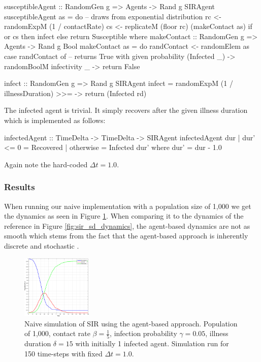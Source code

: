 \begin{HaskellCode}
susceptibleAgent :: RandomGen g => Agents -> Rand g SIRAgent
susceptibleAgent as = do
    -- draws from exponential distribution
    rc <- randomExpM (1 / contactRate) 
    cs <- replicateM (floor rc) (makeContact as)
    if or cs
      then infect
      else return Susceptible
  where
    makeContact :: RandomGen g => Agents -> Rand g Bool
    makeContact as = do
      randContact <- randomElem as
      case randContact of
        -- returns True with given probability 
        (Infected _) -> randomBoolM infectivity 
        _            -> return False

    infect :: RandomGen g => Rand g SIRAgent
    infect = randomExpM (1 / illnessDuration) 
               >>= \rd -> return (Infected rd)
\end{HaskellCode}

The infected agent is trivial. It simply recovers after the given illness duration which is implemented as follows:

\begin{HaskellCode}
infectedAgent :: TimeDelta -> TimeDelta -> SIRAgent
infectedAgent dur
    | dur' <= 0 = Recovered
    | otherwise = Infected dur'
  where
    dur' = dur - 1.0  
\end{HaskellCode}

Again note the hard-coded $\Delta t = 1.0$.

\subsubsection{Results}
When running our naive implementation with a population size of 1,000 we get the dynamics as seen in Figure \ref{fig:sir_abs_dynamics_naive}. When comparing it to the dynamics of the reference in Figure \ref{fig:sir_sd_dynamics}, the agent-based dynamics are not as smooth which stems from the fact that the agent-based approach is inherently discrete and stochastic \cite{macal_agent-based_2010}.

\begin{figure}
	\centering
	\includegraphics[width=0.30\textwidth, angle=0]{./fig/step1_randmonad/SIR_1000agents_150t_1dt.png}
	\caption{Naive simulation of SIR using the agent-based approach. Population of 1,000, contact rate $\beta = \frac{1}{5}$, infection probability $\gamma = 0.05$, illness duration $\delta = 15$ with initially 1 infected agent. Simulation run for 150 time-steps with fixed $\Delta t = 1.0$.}
	\label{fig:sir_abs_dynamics_naive}
\end{figure}

